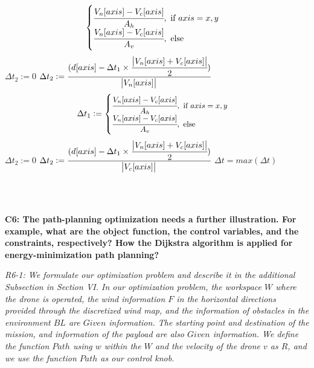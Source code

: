 \documentclass[onecolumn]{IEEEconf}
\begin{document}
\begin{description}
\begin{algorithm}[htp]
{{\begin{equation*}
{\begin{cases}
\cfrac{V_n[axis] - V_c[axis]}{A_h},~\text{if $axis = x,y$}\\
\cfrac{V_n[axis] - V_c[axis]}{A_v},~\text{else}\\
\end{cases}
}
\end{equation*}
{
    $\Delta t_2 := 0$
}
\Else
{
    $\Delta t_2 := \cfrac{(d[axis] - \Delta t_1 \times \cfrac{\abs{V_n[axis] + V_c[axis]}}{2})}{\abs{V_n[axis]}}$
}
}
\Else
{
    \begin{equation*}
        \small{
        \Delta t_1 := 
        \begin{cases}
            \cfrac{V_n[axis] - V_c[axis]}{A_h},~\text{if $axis = x,y$}\\
            \cfrac{V_n[axis] - V_c[axis]}{A_v},~\text{else}\\
        \end{cases}
        }
    \end{equation*}
    {
        $\Delta t_2 := 0$
    }
    \Else
    {
            $\Delta t_2 := \cfrac{(d[axis] - \Delta t_1 \times \cfrac{\abs{V_n[axis] + V_c[axis]}}{2})}{\abs{V_c[axis]}}$
    }
}
}
\Return $\Delta t = max(\Delta t)$
\end{algorithm}
\SetNlSty{}{\color{black}}{:}
\SetAlFnt{\color{black}}
~\\~\\
    \item \textbf
    {
	C6: The path-planning optimization needs a further illustration.  For example, what are the object function, the control variables, and the constraints, respectively?  How the Dijkstra algorithm is applied for energy-minimization path planning? 
	}
	\item \textit
	{
    R6-1: We formulate our optimization problem and describe it in the additional Subsection in Section VI. In our optimization problem, the workspace $W$ where the drone is operated, the wind information $F$ in the horizontal directions provided through the discretized wind map, and the information of obstacles in the environment $BL$ are $Given$ information.
    The starting point and destination of the mission, and information of the payload are also $Given$ information.
    We define the function $Path$ using $w$ within the $W$ and the velocity of the drone $v$ as $R$, and we use the function $Path$ as our control knob.
}
\end{description}
\end{document}
